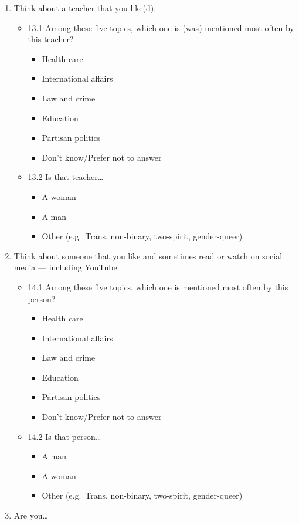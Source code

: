 \documentclass[
  letterpaper,
  DIV=11,
  numbers=noendperiod]{scrreprt}
\providecommand{\tightlist}{%
  \setlength{\itemsep}{0pt}\setlength{\parskip}{0pt}}\usepackage{longtable,booktabs,array}
\begin{document}
\begin{enumerate}
\def\labelenumi{\arabic{enumi}.}
\setcounter{enumi}{12}
\item
  Think about a teacher that you like(d).

  \begin{itemize}
  \tightlist
  \item
    13.1 Among these five topics, which one is (was) mentioned most
    often by this teacher?

    \begin{itemize}
    \tightlist
    \item
      Health care
    \item
      International affairs
    \item
      Law and crime
    \item
      Education
    \item
      Partisan politics
    \item
      Don't know/Prefer not to answer
    \end{itemize}
  \item
    13.2 Is that teacher\ldots{}

    \begin{itemize}
    \tightlist
    \item
      A woman
    \item
      A man
    \item
      Other (e.g.~Trans, non-binary, two-spirit, gender-queer)
    \end{itemize}
  \end{itemize}
\item
  Think about someone that you like and sometimes read or watch on
  social media --- including YouTube.

  \begin{itemize}
  \tightlist
  \item
    14.1 Among these five topics, which one is mentioned most often by
    this person?

    \begin{itemize}
    \tightlist
    \item
      Health care
    \item
      International affairs
    \item
      Law and crime
    \item
      Education
    \item
      Partisan politics
    \item
      Don't know/Prefer not to answer
    \end{itemize}
  \item
    14.2 Is that person\ldots{}

    \begin{itemize}
    \tightlist
    \item
      A man
    \item
      A woman
    \item
      Other (e.g.~Trans, non-binary, two-spirit, gender-queer)
    \end{itemize}
  \end{itemize}
\item
  Are you\ldots{}
\end{enumerate}
\end{document}
